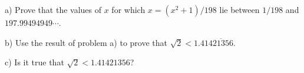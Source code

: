 a) Prove that the values of $x$ for which $x=(x^2+1)/198$ lie between $1/198$ and $197.99494949\cdots$.

b) Use the result of problem a) to prove that $\sqrt{2}<1.41\overline{421356}$.

c) Is it true that $\sqrt{2}<1.41421356$?